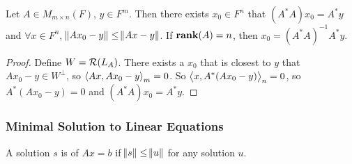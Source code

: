 \begin{theorem}
    Let $A \in M_{m\times n} (F)$, $y \in F^m$. Then there exists $x_0 \in F^n$ that $(A^*A) x_0 = A^* y$ and $\forall x \in F^n$, $ \norm{Ax_0 - y} \leq \norm{Ax-y}$. If $\displaystyle \mathbf{rank}( A ) = n$, then $x_0 = (A^*A)^{-1} A^* y$.
\end{theorem}
\begin{proof}
    Define $W=\mathcal{R}(L_A)$. There exists a $x_0$ that is closest to $y$ that $Ax_0 - y \in W^\bot$, so $\left\langle \displaystyle Ax, Ax_0 - y \right\rangle_m = 0$. So $\left\langle \displaystyle x, A^*(Ax_0 - y) \right\rangle_n = 0$, so $A^*(Ax_0 - y) = 0$ and $(A^*A) x_0 = A^* y$. 
\end{proof}




\subsubsection{Minimal Solution to Linear Equations}

\begin{definition}
    A solution $s$ is  of $Ax=b$ if $\norm{s} \leq \norm{u}$ for any solution $u$.
\end{definition}



